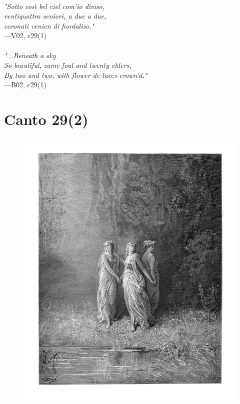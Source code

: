 \documentclass[../Dore_vision.tex]{subfiles}
\begin{document}
\begin{center}
\begin{minipage}{0.8\linewidth}
\textit{\\
"Sotto cos\`{\i} bel ciel com’io diviso,\\ventiquattro seniori, a due a due,\\coronati venien di fiordaliso."} \\
—V02, c29(1) \\~\\
\textit{"...Beneath a sky\\So beautiful, came foul and-twenty elders,\\By two and two, with flower-de-luces crown'd."} \\
—B02, c29(1)
\end{minipage}
\end{center}

\newpage

\section{Canto 29(2)}

\begin{figure}[ht]
\centering
\includegraphics[height=\figsize]{illustrations/book_2/V02, c29(2).jpg}
\end{figure}
\end{document}
